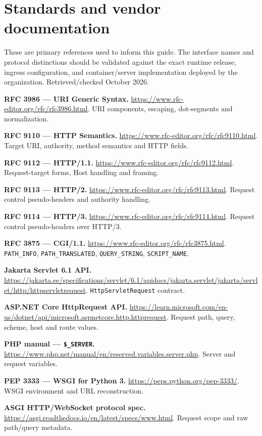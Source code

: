 \documentclass[10pt,letterpaper,oneside]{article}
\newcommand{\code}[1]{\texttt{#1}}
\begin{document}
\section{Standards and vendor documentation}
These are primary references used to inform this guide. The interface names and protocol distinctions should be validated against the exact runtime release, ingress configuration, and container/server implementation deployed by the organization. Retrieved/checked October 2026.
\begin{enumerate}[label={[\arabic*]},leftmargin=2.1em,itemsep=6pt]
\item \textbf{RFC 3986 --- URI Generic Syntax.} \url{https://www.rfc-editor.org/rfc/rfc3986.html}. URI components, escaping, dot-segments and normalization.
\item \textbf{RFC 9110 --- HTTP Semantics.} \url{https://www.rfc-editor.org/rfc/rfc9110.html}. Target URI, authority, method semantics and HTTP fields.
\item \textbf{RFC 9112 --- HTTP/1.1.} \url{https://www.rfc-editor.org/rfc/rfc9112.html}. Request-target forms, Host handling and framing.
\item \textbf{RFC 9113 --- HTTP/2.} \url{https://www.rfc-editor.org/rfc/rfc9113.html}. Request control pseudo-headers and authority handling.
\item \textbf{RFC 9114 --- HTTP/3.} \url{https://www.rfc-editor.org/rfc/rfc9114.html}. Request control pseudo-headers over HTTP/3.
\item \textbf{RFC 3875 --- CGI/1.1.} \url{https://www.rfc-editor.org/rfc/rfc3875.html}. \code{PATH\_INFO}, \code{PATH\_TRANSLATED}, \code{QUERY\_STRING}, \code{SCRIPT\_NAME}.
\item \textbf{Jakarta Servlet 6.1 API.} \url{https://jakarta.ee/specifications/servlet/6.1/apidocs/jakarta.servlet/jakarta/servlet/http/httpservletrequest}. \code{HttpServletRequest} contract.
\item \textbf{ASP.NET Core HttpRequest API.} \url{https://learn.microsoft.com/en-us/dotnet/api/microsoft.aspnetcore.http.httprequest}. Request path, query, scheme, host and route values.
\item \textbf{PHP manual --- \code{\$\_SERVER}.} \url{https://www.php.net/manual/en/reserved.variables.server.php}. Server and request variables.
\item \textbf{PEP 3333 --- WSGI for Python 3.} \url{https://peps.python.org/pep-3333/}. WSGI environment and URL reconstruction.
\item \textbf{ASGI HTTP/WebSocket protocol spec.} \url{https://asgi.readthedocs.io/en/latest/specs/www.html}. Request scope and raw path/query metadata.

\end{enumerate}
\end{document}

